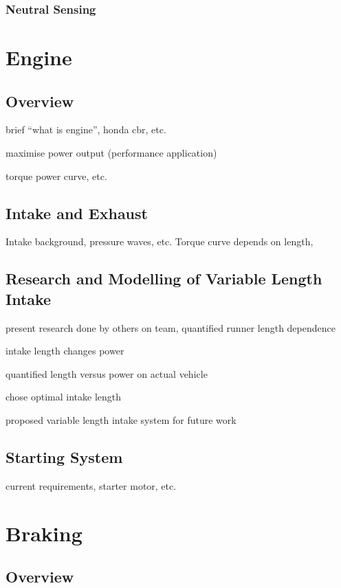 \subsubsection{Neutral Sensing}


\section{Engine}


\subsection{Overview}

brief {}``what is engine'', honda cbr, etc.

maximise power output (performance application)

torque power curve, etc.


\subsection{Intake and Exhaust}

Intake background, pressure waves, etc. Torque curve depends on length, 


\subsection{Research and Modelling of Variable Length Intake}

present research done by others on team, quantified runner length
dependence

intake length changes power

quantified length versus power on actual vehicle

chose optimal intake length

proposed variable length intake system for future work


\subsection{Starting System}

current requirements, starter motor, etc.


\section{Braking}


\subsection{Overview}

